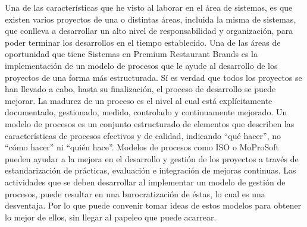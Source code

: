 Una de las características que he visto al laborar en el área de sistemas, es que existen varios proyectos de una o distintas áreas, incluida la misma de sistemas, que conlleva a desarrollar un alto nivel de responsabilidad y organización, para poder terminar los desarrollos en el tiempo establecido. Una de las áreas de oportunidad que tiene Sistemas en Premium Restaurant Brands es la implementación de un modelo de procesos que le ayude al desarrollo de los proyectos de una forma más estructurada. Sí es verdad que todos los proyectos se han llevado a cabo, hasta su finalización, el proceso de desarrollo se puede mejorar. La madurez de un proceso es el nivel al cual está explícitamente documentado, gestionado, medido, controlado y continuamente mejorado. Un modelo de procesos es un conjunto estructurado de elementos que describen las características de procesos efectivos y de calidad, indicando ``qué hacer'', no ``cómo hacer'' ni ``quién hace''. Modelos de procesos como ISO o MoProSoft pueden ayudar a la mejora en el desarrollo y gestión de los proyectos a través de estandarización de prácticas, evaluación e integración de mejoras continuas. Las actividades que se deben desarrollar al implementar un modelo de gestión de procesos, puede resultar en una  burocratización de éstas, lo cual es una desventaja. Por lo que puede convenir tomar ideas de estos modelos para obtener lo mejor de ellos, sin llegar al papeleo que puede acarrear.
